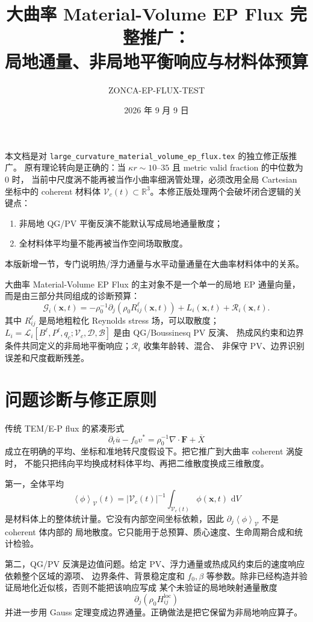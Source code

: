 \documentclass[12pt,a4paper]{ctexart}
\title{\bfseries 大曲率 Material-Volume EP Flux 完整推广：\\局地通量、非局地平衡响应与材料体预算}
\author{ZONCA-EP-FLUX-TEST}
\date{2026 年 9 月 9 日}
\newcommand{\p}{\partial}
\newcommand{\dd}{\,\mathrm d}
\newcommand{\meanV}[1]{\left\langle #1\right\rangle_{\mathcal V}}
\newcommand{\bx}{\boldsymbol x}
\newcommand{\GG}{\mathcal G}
\newcommand{\LL}{\mathcal L}
\newcommand{\RR}{\mathcal R}
\newcommand{\VV}{\mathcal V_c}
\begin{document}
\maketitle

本文档是对 \texttt{large\_curvature\_material\_volume\_ep\_flux.tex} 的独立修正版推广。
原有理论转向是正确的：当 $\kappa r\sim 10\text{--}35$ 且 metric valid fraction 的中位数为 $0$ 时，
当前中尺度涡不能再被当作小曲率细涡管处理，必须改用全局 Cartesian 坐标中的 coherent 材料体
$\VV(t)\subset\mathbb R^3$。本修正版处理两个会破坏闭合逻辑的关键点：
\begin{enumerate}[label=\arabic*.]
  \item 非局地 QG/PV 平衡反演不能默认写成局地通量散度；
  \item 全材料体平均量不能再被当作空间场取散度。
\end{enumerate}
本版新增一节，专门说明热/浮力通量与水平动量通量在大曲率材料体中的关系。

\begin{tcolorbox}[colback=blue!3,colframe=blue!65!black,title={修正后的核心口径},fonttitle=\bfseries]
大曲率 Material-Volume EP Flux 的主对象不是一个单一的局地 EP 通量向量，
而是由三部分共同组成的诊断预算：
\[
  \boxed{
  \GG_i(\bx,t)
  =
  -\rho_0^{-1}\p_j\!\left(\rho_0 R_{ij}^{\ell}(\bx,t)\right)
  +
  L_i(\bx,t)
  +
  \RR_i(\bx,t)
  }.
\]
其中 $R_{ij}^{\ell}$ 是局地粗粒化 Reynolds stress 场，可以取散度；
$L_i=\LL_i[B^{\ell},P^{\ell},q_c;\VV,\mathcal D,\mathcal B]$ 是由 QG/Boussinesq PV 反演、
热成风约束和边界条件共同定义的非局地平衡响应；$\RR_i$ 收集年龄转、混合、
非保守 PV、边界识别误差和尺度截断残差。
\end{tcolorbox}

\section{问题诊断与修正原则}

传统 TEM/E-P flux 的紧凑形式
\[
  \p_t\overline u-f_0v^*
  =
  \rho_0^{-1}\nabla\cdot\boldsymbol F+\overline X
\]
成立在明确的平均、坐标和准地转尺度假设下。把它推广到大曲率 coherent 涡旋时，
不能只把纬向平均换成材料体平均、再把二维散度换成三维散度。

第一，全体平均
\[
  \meanV{\phi}(t)
  =
  |\VV(t)|^{-1}\int_{\VV(t)}\phi(\bx,t)\,\dd V
\]
是材料体上的整体统计量。它没有内部空间坐标依赖，因此 $\p_j\meanV{\phi}$ 不是 coherent 体内部的
局地散度。它只能用于总预算、质心速度、生命周期合成和统计检验。

第二，QG/PV 反演是边值问题。给定 PV、浮力通量或热成风约束后的速度响应依赖整个区域的源项、
边界条件、背景稳定度和 $f_0,\beta$ 等参数。除非已经构造并验证局地化近似核，否则不能把该响应写成
某个未验证的局地映射通量散度
\[
  \p_j\left(\rho_0 H_{ij}^{\mathrm{loc}}\right)
\]
并进一步用 Gauss 定理变成边界通量。正确做法是把它保留为非局地响应算子。
\end{document}
